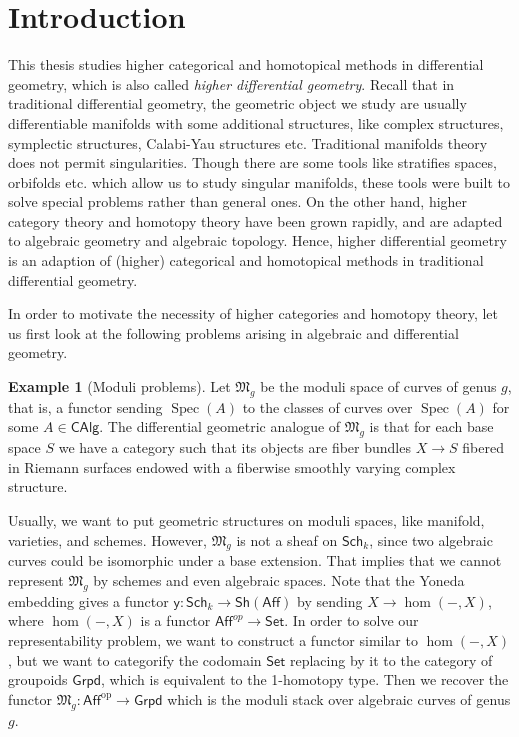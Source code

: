 \documentclass[12pt]{amsart}
\theoremstyle{definition}
\newtheorem{example}[thm]{Example}
\theoremstyle{remark}
\numberwithin{equation}{section}
\newcommand{\1}{{\mathbb{1}}}
\newcommand{\y}{\mathsf{y}}
\newcommand{\op}{\operatorname{op}}
\newcommand{\set}{\mathsf{Set}}
\newcommand{\sch}{\mathsf{Sch}}
\newcommand{\gpd}{\mathsf{Grpd}}
\newcommand{\aff}{\mathsf{Aff}}\newcommand{\alg}{\mathsf{Alg}}
\newcommand{\calg}{\mathsf{CAlg}}
\newcommand{\sh}{\mathsf{Sh}}
\newcommand{\M}{{\mathfrak{M}}}
\newcommand{\spec}{\operatorname{Spec}}
\begin{document}
\section{Introduction}
This thesis studies higher categorical and homotopical methods in differential geometry, which is also called {\it higher differential geometry}. Recall that in traditional differential geometry, the geometric object we study are usually differentiable manifolds with some additional structures, like complex structures, symplectic structures, Calabi-Yau structures etc. Traditional manifolds theory does not permit singularities. Though there are some tools like stratifies spaces, orbifolds etc. which allow us to study singular manifolds, these tools were built to solve special problems rather than general ones. On the other hand, higher category theory and homotopy theory have been grown rapidly, and are adapted to algebraic geometry and algebraic topology. Hence, higher differential geometry is an adaption of (higher) categorical and homotopical methods in traditional differential geometry.

In order to motivate the necessity of higher categories and homotopy theory, let us first look at the following problems arising in algebraic and differential geometry.




\begin{example}[Moduli problems]
    Let $\M_g$ be the moduli space of curves of genus $g$, that is, a functor sending $\spec(A)$ to the classes of  curves over $\spec(A)$ for some $A\in \calg$. The differential geometric analogue of $\M_g$ is that for each base space $S$ we have a category such that its objects are fiber bundles $X\to S$ fibered in Riemann surfaces endowed with a fiberwise smoothly varying complex structure. 

Usually, we want to put geometric structures on moduli spaces, like manifold,  varieties, and schemes. However, $\M_g$ is not a sheaf on $\sch_k$, since two algebraic curves could be isomorphic under a base extension. That implies that we cannot represent $\M_g$ by schemes and even algebraic spaces. Note that the Yoneda embedding gives a functor $\y: \sch_k \to   \sh(\aff)$ by sending $X \to \hom (-, X)$, where $\hom(-,X)$ is a functor $\aff^{op}\to \set$. In order to solve our representability problem, we want to construct a functor similar to $\hom (-, X)$, but we want to categorify the codomain $\set$ replacing by it to the category of groupoids $\gpd$, which is equivalent to the 1-homotopy type. Then we recover the functor $\M_g:\aff^{\op} \to \gpd$ which is the moduli stack over algebraic curves of genus $g$. 
\end{example}
\end{document}
